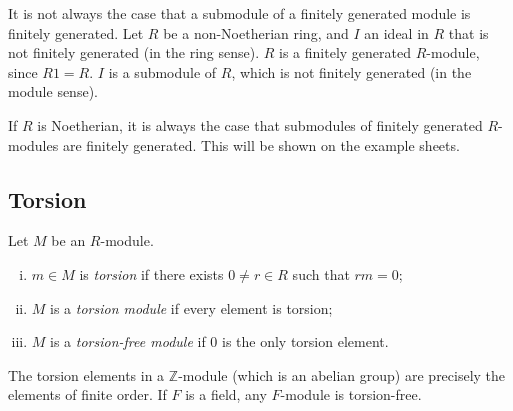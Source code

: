 \begin{example}
	It is not always the case that a submodule of a finitely generated module is finitely generated.
	Let \( R \) be a non-Noetherian ring, and \( I \) an ideal in \( R \) that is not finitely generated (in the ring sense).
	\( R \) is a finitely generated \( R \)-module, since \( R1 = R \).
	\( I \) is a submodule of \( R \), which is not finitely generated (in the module sense).
\end{example}
\begin{remark}
	If \( R \) is Noetherian, it is always the case that submodules of finitely generated \( R \)-modules are finitely generated.
	This will be shown on the example sheets.
\end{remark}

\subsection{Torsion}
\begin{definition}
	Let \( M \) be an \( R \)-module.
	\begin{enumerate}[(i)]
		\item \( m \in M \) is \textit{torsion} if there exists \( 0 \neq r \in R \) such that \( rm = 0 \);
		\item \( M \) is a \textit{torsion module} if every element is torsion;
		\item \( M \) is a \textit{torsion-free module} if 0 is the only torsion element.
	\end{enumerate}
\end{definition}
\begin{example}
	The torsion elements in a \( \mathbb Z \)-module (which is an abelian group) are precisely the elements of finite order.
	If \( F \) is a field, any \( F \)-module is torsion-free.
\end{example}

